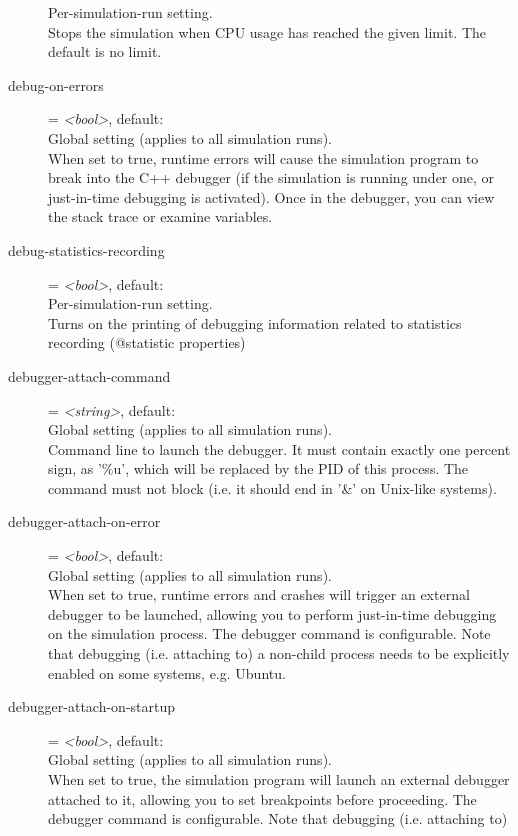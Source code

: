 \begin{description}
    Per-simulation-run setting.\\
    Stops the simulation when CPU usage has reached the given limit. The
    default is no limit.
\item[debug-on-errors] = \textit{<bool>}, default: \\
    Global setting (applies to all simulation runs).\\
    When set to true, runtime errors will cause the simulation program to break
    into the C++ debugger (if the simulation is running under one, or
    just-in-time debugging is activated). Once in the debugger, you can view
    the stack trace or examine variables.
\item[debug-statistics-recording] = \textit{<bool>}, default: \\
    Per-simulation-run setting.\\
    Turns on the printing of debugging information related to statistics
    recording (@statistic properties)
\item[debugger-attach-command] = \textit{<string>}, default: \\
    Global setting (applies to all simulation runs).\\
    Command line to launch the debugger. It must contain exactly one percent
    sign, as '\%u', which will be replaced by the PID of this process. The
    command must not block (i.e. it should end in '\&' on Unix-like systems).
\item[debugger-attach-on-error] = \textit{<bool>}, default: \\
    Global setting (applies to all simulation runs).\\
    When set to true, runtime errors and crashes will trigger an external
    debugger to be launched, allowing you to perform just-in-time debugging on
    the simulation process. The debugger command is configurable. Note that
    debugging (i.e. attaching to) a non-child process needs to be explicitly
    enabled on some systems, e.g. Ubuntu.
\item[debugger-attach-on-startup] = \textit{<bool>}, default: \\
    Global setting (applies to all simulation runs).\\
    When set to true, the simulation program will launch an external debugger
    attached to it, allowing you to set breakpoints before proceeding. The
    debugger command is configurable.  Note that debugging (i.e. attaching to)

\end{description}
